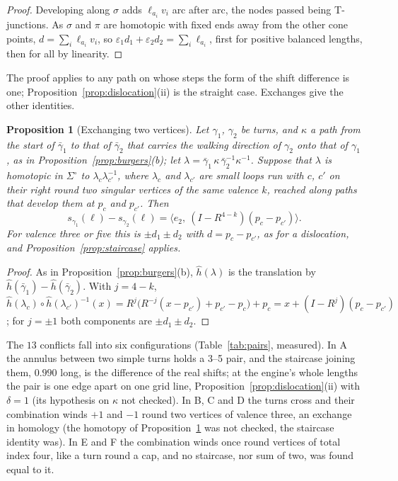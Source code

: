 \documentclass[11pt,a4paper]{article}
\newtheorem{proposition}{Proposition}
\newcommand{\shift}{s}
\begin{document}
\begin{proof}
Developing along $\sigma$ adds $\ell_{a_i} v_i$ arc after arc, the nodes passed
being T-junctions. As $\sigma$ and $\pi$ are homotopic with fixed ends away
from the other cone points, $d = \sum_i \ell_{a_i} v_i$, so $\varepsilon_1 d_1
+ \varepsilon_2 d_2 = \sum_i \ell_{a_i}$, first for positive balanced lengths,
then for all by linearity.
\end{proof}

The proof applies to any path on whose steps the form of the shift difference
is one; Proposition~\ref{prop:dislocation}(ii) is the straight case.
Exchanges give the other identities.

\begin{proposition}[Exchanging two vertices]\label{prop:swap}
Let $\gamma_1$, $\gamma_2$ be turns, and $\kappa$ a path from the start of
$\bar\gamma_1$ to that of $\bar\gamma_2$ that carries the walking direction of
$\gamma_2$ onto that of $\gamma_1$, as in Proposition~\ref{prop:burgers}(b);
let $\lambda = \bar\gamma_1\, \kappa\, \bar\gamma_2^{-1} \kappa^{-1}$.
Suppose that $\lambda$ is homotopic in $\Sigma^\circ$ to $\lambda_c
\lambda_{c'}^{-1}$, where $\lambda_c$ and $\lambda_{c'}$ are small loops run
with $c$, $c'$ on their right round two singular vertices of the same valence
$k$, reached along paths that develop them at $p_c$ and $p_{c'}$. Then
\[
  \shift_{\gamma_1}(\ell) - \shift_{\gamma_2}(\ell) = \bigl\langle e_2,\
  (I - R^{4-k})(p_c - p_{c'}) \bigr\rangle .
\]
For valence three or five this is $\pm d_1 \pm d_2$ with $d = p_c - p_{c'}$,
as for a dislocation, and Proposition~\ref{prop:staircase} applies.
\end{proposition}

\begin{proof}
As in Proposition~\ref{prop:burgers}(b), $\hat h(\lambda)$ is the translation by
$\hat h(\bar\gamma_1) - \hat h(\bar\gamma_2)$. With $j = 4 - k$, $\hat
h(\lambda_c) \circ \hat h(\lambda_{c'})^{-1}(x) = R^j\bigl(R^{-j}(x - p_{c'}) +
p_{c'} - p_c\bigr) + p_c = x + (I - R^j)(p_c - p_{c'})$; for $j = \pm1$ both
components are $\pm d_1 \pm d_2$.
\end{proof}

The $13$ conflicts fall into six configurations (Table~\ref{tab:pairs},
measured). In A the annulus between two simple turns holds a 3--5 pair, and the
staircase joining them, $0.990$ long, is the difference of the real shifts;
at the engine's whole lengths the pair is one edge apart on one grid line,
Proposition~\ref{prop:dislocation}(ii) with $\delta = 1$ (its hypothesis on
$\kappa$ not checked). In B, C and D
the turns cross and their combination winds $+1$ and $-1$ round two vertices
of valence three, an exchange in homology (the homotopy of
Proposition~\ref{prop:swap} was not checked, the staircase identity was). In E
and F the combination winds once round vertices of total index four, like a
turn round a cap, and no staircase, nor sum of two, was found equal to it.
\end{document}
